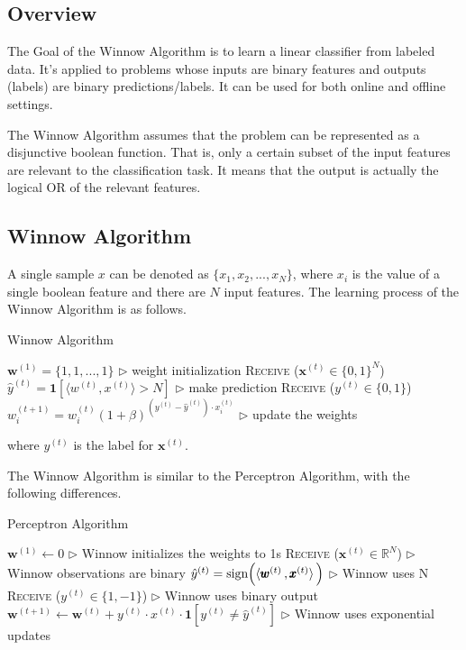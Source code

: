 \documentclass[11pt]{article}
\begin{document}
\subsection{Overview}
The Goal of the Winnow Algorithm is to learn a linear classifier from labeled data. It's applied to problems whose inputs are binary features and outputs (labels) are binary predictions/labels. It can be used for both online and offline settings.

The Winnow Algorithm assumes that the problem can be represented as a disjunctive boolean function. That is, only a certain subset of the input features are relevant to the classification task. It means that the output is actually the logical OR of the relevant features.

\subsection{Winnow Algorithm}

A single sample \textbf{$x$} can be denoted as $\{x_1, x_2, ..., x_N\}$, where $x_i$ is the value of a single boolean feature and there are $N$ input features. The learning process of the Winnow Algorithm is as follows.

\begin{algorithm}[H]
\caption{Winnow Algorithm}
\label{algo:winnow}
\begin{algorithmic}[1]
\STATE $\pmb{w}^{(1)} = \{1, 1, ..., 1\}$
\hfill $\triangleright$ weight initialization
\STATE \textsc{Receive} ($\pmb{x}^{(t)} \in \{0, 1\}^N$) 
\STATE $\hat{y}^{(t)} = \pmb{1}[\big\langle w^{(t)},  x^{(t)}\big\rangle > N]$ 
\hfill $\triangleright$ make prediction
\STATE \textsc{Receive} ($y^{(t)}\in\{0, 1\}$)
\STATE $w_i^{(t+1)} = w_i^{(t)}(1 + \beta)^{(y^{(t)} - \hat{y}^{(t)}) \cdot x_i^{(t)}}$
\hfill $\triangleright$ update the weights
\ENDFOR
\end{algorithmic}
\end{algorithm}

where $y^{(t)}$ is the label for $\pmb{x}^{(t)}$.

The Winnow Algorithm is similar to the Perceptron Algorithm, with the following differences.

\begin{algorithm}[H]
\caption{Perceptron Algorithm}
\label{algo:perceptron_comp}
\begin{algorithmic}[1]
\STATE $\pmb{w}^{(1)} \leftarrow 0$ \hfill $\triangleright$ Winnow initializes the weights to 1s
\STATE \textsc{Receive} ($\pmb{x}^{(t)}\in \mathbb{R}^N$) \hfill $\triangleright$ Winnow observations are binary
\STATE $\hat{y}^{(t)} = \text{sign}\Big( \langle  \pmb{w}^{(t)}  \, ,  \pmb{x}^{(t)}  \rangle\,\Big)$ \hfill $\triangleright$ Winnow uses N
\STATE \textsc{Receive} ($y^{(t)}\in\{1, -1\}$) \hfill $\triangleright$ Winnow uses binary output
\STATE $\pmb{w}^{(t+1)}\leftarrow \pmb{w}^{(t)} + y^{(t)} \cdot x^{(t)} \cdot\pmb{1}[y^{(t)}\neq \hat{y}^{(t)}] $ \hfill $\triangleright$ Winnow uses exponential updates
\ENDFOR
\end{algorithmic}
\end{algorithm}
\end{document}
